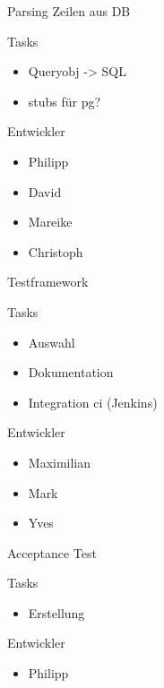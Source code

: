 \documentclass{beamer}
\begin{document}
\begin{frame}{Parsing Zeilen aus DB}
    \begin{block}{Tasks}
        \begin{itemize}
        \item Queryobj -> SQL
        \item stubs für pg?
        \end{itemize}
    \end{block}
    \begin{block}{Entwickler}
        \begin{itemize}
        \item Philipp
        \item David
        \item Mareike
        \item Christoph
        \end{itemize}
    \end{block}
\end{frame}

\begin{frame}{Testframework}
    \begin{block}{Tasks}
        \begin{itemize}
        \item Auswahl
        \item Dokumentation
        \item Integration ci (Jenkins)
        \end{itemize}
    \end{block}
    \begin{block}{Entwickler}
        \begin{itemize}
        \item Maximilian
        \item Mark
        \item Yves
        \end{itemize}
    \end{block}

\end{frame}

\begin{frame}{Acceptance Test}
    \begin{block}{Tasks}
        \begin{itemize}
        \item Erstellung
        \end{itemize}
    \end{block}
    \begin{block}{Entwickler}
        \begin{itemize}
        \item Philipp
        \end{itemize}
    \end{block}

\end{frame}
\end{document}
